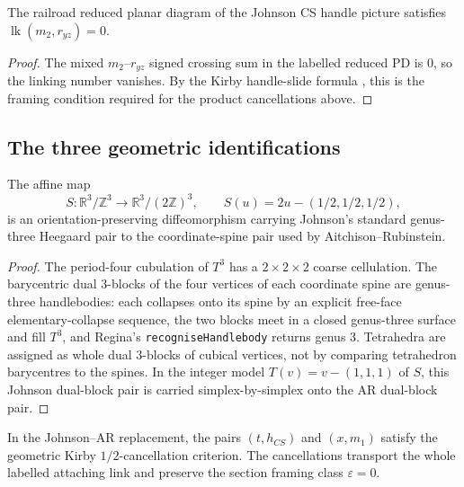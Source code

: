 \begin{lemma}\label{lem:P0d-link}
The railroad reduced planar diagram of the Johnson CS handle picture satisfies
$\operatorname{lk}(m_2,r_{yz})=0$.
\end{lemma}

\begin{proof}
The mixed $m_2$--$r_{yz}$ signed crossing sum in the labelled reduced PD is
$0$, so the linking number vanishes.  By the Kirby handle-slide formula
\cite{Kirby1978}, this is the framing condition required for the product
cancellations above.
\end{proof}

\subsection{The three geometric identifications}

\begin{lemma}\label{lem:P0a}
The affine map
\[
S:\mathbb R^3/\mathbb Z^3\longrightarrow
\mathbb R^3/(2\mathbb Z)^3,\qquad
S(u)=2u-(1/2,1/2,1/2),
\]
is an orientation-preserving diffeomorphism carrying Johnson's standard
genus-three Heegaard pair to the coordinate-spine pair used by
Aitchison--Rubinstein.
\end{lemma}

\begin{proof}
The period-four cubulation of $T^3$ has a $2\times 2\times 2$ coarse
cellulation.  The barycentric dual $3$-blocks of the four vertices of each
coordinate spine are genus-three handlebodies: each collapses onto its spine
by an explicit free-face elementary-collapse sequence, the two blocks meet
in a closed genus-three surface and fill $T^3$, and Regina's
\texttt{recogniseHandlebody} returns genus $3$.  Tetrahedra are assigned as
whole dual $3$-blocks of cubical vertices, not by comparing tetrahedron
barycentres to the spines.  In the integer model $T(v)=v-(1,1,1)$ of $S$,
this Johnson dual-block pair is carried simplex-by-simplex onto the AR
dual-block pair.
\end{proof}

\begin{lemma}\label{lem:P0b}
In the Johnson--AR replacement, the pairs \((t,h_{CS})\) and \((x,m_1)\)
satisfy the geometric Kirby \(1/2\)-cancellation criterion.  The
cancellations transport the whole labelled attaching link and preserve the
section framing class \(\varepsilon=0\).
\end{lemma}

